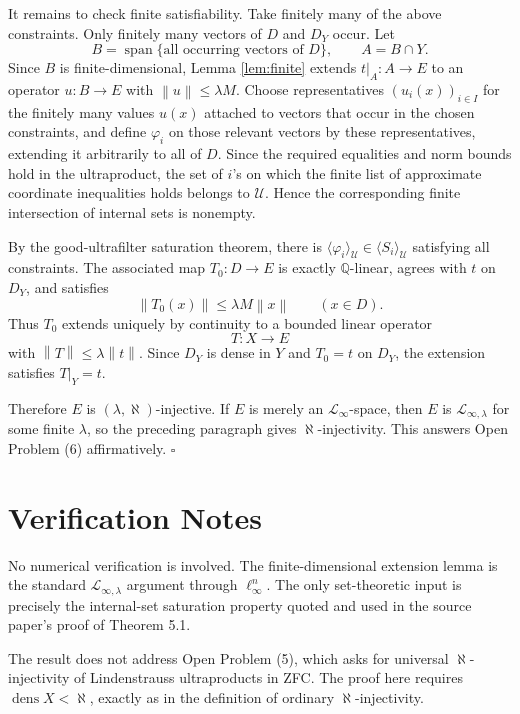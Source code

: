 \documentclass[11pt]{article}
\newcommand{\U}{\mathcal U}
\newcommand{\dens}{\operatorname{dens}}
\newcommand{\norm}[1]{\left\lVert #1 \right\rVert}
\begin{document}
It remains to check finite satisfiability.  Take finitely many of the above
constraints.  Only finitely many vectors of \(D\) and \(D_Y\) occur.  Let
\[
  B=\operatorname{span}\{ \text{all occurring vectors of }D\},\qquad
  A=B\cap Y .
\]
Since \(B\) is finite-dimensional, Lemma \ref{lem:finite} extends
\(t|_A:A\to E\) to an operator \(u:B\to E\) with
\(\norm u\le \lambda M\).  Choose representatives \((u_i(x))_{i\in I}\) for
the finitely many values \(u(x)\) attached to vectors that occur in the chosen
constraints, and define \(\varphi_i\) on those relevant vectors by these
representatives, extending it arbitrarily to all of \(D\).  Since the required
equalities and
norm bounds hold in the ultraproduct, the set of \(i\)'s on which the finite
list of approximate coordinate inequalities holds belongs to \(\U\).  Hence
the corresponding finite intersection of internal sets is nonempty.

By the good-ultrafilter saturation theorem, there is
\(\langle \varphi_i\rangle_\U\in \langle S_i\rangle_\U\) satisfying all
constraints.  The associated map \(T_0:D\to E\) is exactly
\(\mathbb Q\)-linear, agrees with \(t\) on \(D_Y\), and satisfies
\[
  \norm{T_0(x)}\le \lambda M\norm x\qquad(x\in D).
\]
Thus \(T_0\) extends uniquely by continuity to a bounded linear operator
\[
  T:X\to E
\]
with \(\norm T\le\lambda\norm t\).  Since \(D_Y\) is dense in \(Y\) and
\(T_0=t\) on \(D_Y\), the extension satisfies \(T|_Y=t\).

Therefore \(E\) is \((\lambda,\aleph)\)-injective.  If \(E\) is merely an
\(\mathcal L_\infty\)-space, then \(E\) is
\(\mathcal L_{\infty,\lambda}\) for some finite \(\lambda\), so the preceding
paragraph gives \(\aleph\)-injectivity.  This answers Open Problem (6)
affirmatively.
\(\square\)

\section*{Verification Notes}

No numerical verification is involved.  The finite-dimensional extension lemma
is the standard \(\mathcal L_{\infty,\lambda}\) argument through
\(\ell_\infty^n\).  The only set-theoretic input is precisely the internal-set
saturation property quoted and used in the source paper's proof of Theorem
5.1.

The result does not address Open Problem (5), which asks for universal
\(\aleph\)-injectivity of Lindenstrauss ultraproducts in ZFC.  The proof here
requires \(\dens X<\aleph\), exactly as in the definition of ordinary
\(\aleph\)-injectivity.
\end{document}
